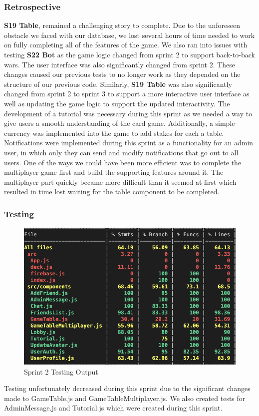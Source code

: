 \subsubsection{Retrospective}
\textbf{S19 Table}, remained a challenging story to complete. Due to the unforeseen obstacle we faced with our database, we lost several hours of time needed to work on fully completing all of the features of the game. We also ran into issues with testing \textbf{S22 Bot} as the game logic changed from sprint 2 to support back-to-back wars. The user interface was also significantly changed from sprint 2. These changes caused our previous tests to no longer work as they depended on the structure of our previous code. Similarly, \textbf{S19 Table} was also significantly changed from sprint 2 to sprint 3 to support a more interactive user interface as well as updating the game logic to support the updated interactivity. The development of a tutorial was necessary during this sprint as we needed a way to give users a smooth understanding of the card game. Additionally, a simple currency was implemented into the game to add stakes for each a table. Notifications were implemented during this sprint as a functionality for an admin user, in which only they can send and modify notifications that go out to all users. One of the ways we could have been more efficient was to complete the multiplayer game first and build the supporting features around it. The multiplayer part quickly became more difficult than it seemed at first which resulted in time lost waiting for the table component to be completed. 


\subsubsection {Testing}
\begin{figure}[h]
    \centering
    \includegraphics[width=1\linewidth]{documentation/figures/Testing sprint 3.png}
    \caption{Sprint 2 Testing Output}
    \label{fig:enter-label}
\end{figure}
Testing unfortunately decreased during this sprint due to the significant changes made to GameTable.js and GameTableMultiplayer.js. We also created tests for AdminMessage.js and Tutorial.js which were created during this sprint. 

